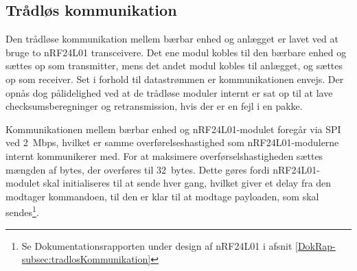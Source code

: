 \subsection{Trådløs kommunikation}
Den trådløse kommunikation mellem bærbar enhed og anlægget er lavet ved at bruge to nRF24L01 transceivere. Det ene modul kobles til den bærbare enhed og sættes op som transmitter, mens det andet modul kobles til anlægget, og sættes op som receiver. 
Set i forhold til datastrømmen er kommunikationen envejs. Der opnås dog pålidelighed ved at de trådløse moduler internt er sat op til at lave checksumsberegninger og retransmission, hvis der er en fejl i en pakke.

Kommunikationen mellem bærbar enhed og nRF24L01-modulet foregår via SPI ved \SI{2}{Mbps}, hvilket er samme overførelseshastighed som nRF24L01-modulerne internt kommunikerer med. For at maksimere overførselshastigheden sættes mængden af bytes, der overføres til \SI{32}{bytes}. Dette gøres fordi nRF24L01-modulet skal initialiseres til at sende hver gang, hvilket giver et delay fra den modtager kommandoen, til den er klar til at modtage payloaden, som skal sendes\footnote{Se Dokumentationsrapporten under design af nRF24L01 i afsnit \vref{DokRap-subsec:tradlosKommunikation}}.

